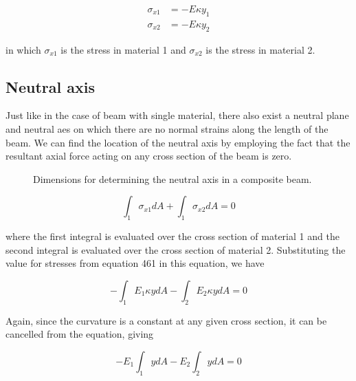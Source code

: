 \documentclass[
fontsize=10pt,
a4paper,
twosides=false,
open=any,
svgnames,
]{kaobook} %
\begin{document}
\begin{align}
  {\sigma _{x1}} &=  - E\kappa {y_1}  \nonumber \\
  {\sigma _{x2}} &=  - E\kappa {y_2} 
\end{align}

in which $\sigma_{x1}$ is the stress in material 1 and $\sigma_{x2}$ is the stress in material 2.

\subsection{Neutral axis}

Just like in the case of beam with single material, there also exist a neutral plane and neutral aes on which there are no normal strains along the length of the beam. We can find the location of the neutral axis by employing the fact that the resultant axial force acting on any cross section of the beam is zero.

\begin{figure}[h]
  \centering
  \caption{Dimensions for determining the neutral axis in a composite beam.}
\end{figure}

\[ \int_1 \sigma_{x1}dA  + \int_1 \sigma_{x2}dA  = 0 \]

where the first integral is evaluated over the cross section of material 1 and the second integral is evaluated over the cross section of material 2. Substituting the value for stresses from equation 461 in this equation, we have

\[ - \int_1 E_1\kappa ydA  - \int_2 E_2\kappa ydA  = 0\]

Again, since the curvature is a constant at any given cross section, it can be cancelled from the equation, giving

\begin{equation} \label{eqn: composite beam neutral axis}
  -E_1\int_1 ydA  - E_2\int_2 ydA  = 0
\end{equation}
\end{document}
